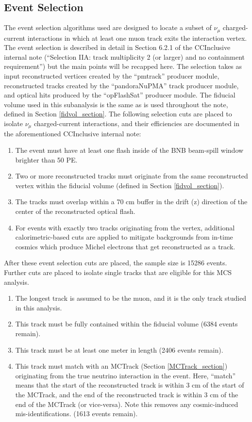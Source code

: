 \subsection{Event Selection}\label{MC_BNB_eventselection_section}
The event selection algorithms used are designed to locate a subset of $\nu_\mu$ charged-current interactions in which at least one muon track exits the interaction vertex. The event selection is described in detail in Section 6.2.1 of the {\ub} CCInclusive internal note (``Selection IIA: track multiplicity 2 (or larger) and no containment requirement'')\cite{CCIncInternalNote}  but the main points will be recapped here. The selection takes as input reconstructed vertices created by the ``pmtrack'' producer module, reconstructed tracks created by the ``pandoraNuPMA'' track producer module, and optical hits produced by the ``opFlashSat'' producer module. The fiducial volume used in this subanalysis is the same as is used throughout the note, defined in Section \ref{fidvol_section}. The following selection cuts are placed to isolate $\nu_\mu$ charged-current interactions, and their efficiencies are documented in the aforementioned CCInclusive internal note:
\begin{enumerate}
\item The event must have at least one flash inside of the BNB beam-spill window brighter than 50 PE.
\item Two or more reconstructed tracks must originate from the same reconstructed vertex within the fiducial volume (defined in Section \ref{fidvol_section}).
\item The tracks must overlap within a 70 cm buffer in the drift (z) direction of the center of the reconstructed optical flash.
\item For events with exactly two tracks originating from the vertex, additional calorimetric-based cuts are applied to mitigate backgrounds from in-time cosmics which produce Michel electrons that get reconstructed as a track.
\end{enumerate}
After these event selection cuts are placed, the sample size is 15286 events. Further cuts are placed to isolate single tracks that are eligible for this MCS analysis. 
\begin{enumerate}
\item The longest track is assumed to be the muon, and it is the only track studied in this analysis. 
\item This track must be fully contained within the fiducial volume (6384 events remain).
\item This track must be at least one meter in length (2406 events remain).
\item This track must match with an {\sc MCTrack} (Section \ref{MCTrack_section}) originating from the true neutrino interaction in the event. Here, ``match'' means that the start of the reconstructed track is within 3 cm of the start of the {\sc MCTrack}, and the end of the reconstructed track is within 3 cm of the end of the {\sc MCTrack} (or vice-versa). Note this removes any cosmic-induced mis-identifications. (1613 events remain).

\end{enumerate}


